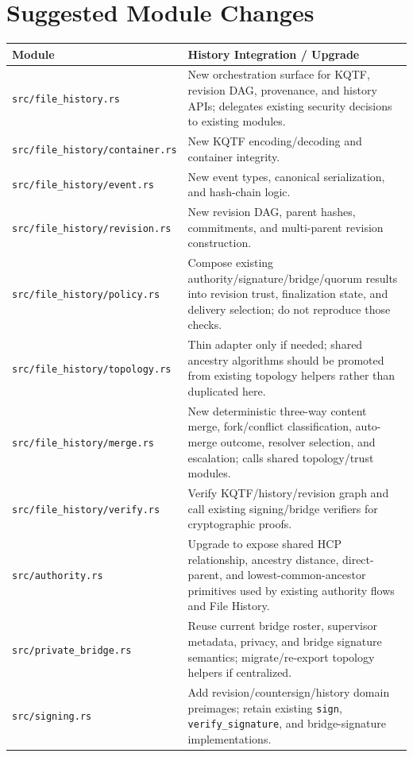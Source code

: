 \documentclass[11pt]{article}
\begin{document}
\section{Suggested Module Changes}

{\small
\setlength{\tabcolsep}{5pt}
\renewcommand{\arraystretch}{1.12}
\begin{tabularx}{\textwidth}{
  >{\raggedright\arraybackslash}p{}
  >{\raggedright\arraybackslash}X
}
\toprule
\textbf{Module} & \textbf{History Integration / Upgrade} \\
\midrule
\texttt{src/file\_history.rs} & New orchestration surface for KQTF, revision DAG, provenance, and history APIs; delegates existing security decisions to existing modules. \\
\texttt{src/file\_history/container.rs} & New KQTF encoding/decoding and container integrity. \\
\texttt{src/file\_history/event.rs} & New event types, canonical serialization, and hash-chain logic. \\
\texttt{src/file\_history/revision.rs} & New revision DAG, parent hashes, commitments, and multi-parent revision construction. \\
\texttt{src/file\_history/policy.rs} & Compose existing authority/signature/bridge/quorum results into revision trust, finalization state, and delivery selection; do not reproduce those checks. \\
\texttt{src/file\_history/topology.rs} & Thin adapter only if needed; shared ancestry algorithms should be promoted from existing topology helpers rather than duplicated here. \\
\texttt{src/file\_history/merge.rs} & New deterministic three-way content merge, fork/conflict classification, auto-merge outcome, resolver selection, and escalation; calls shared topology/trust modules. \\
\texttt{src/file\_history/verify.rs} & Verify KQTF/history/revision graph and call existing signing/bridge verifiers for cryptographic proofs. \\
\texttt{src/authority.rs} & Upgrade to expose shared HCP relationship, ancestry distance, direct-parent, and lowest-common-ancestor primitives used by existing authority flows and File History. \\
\texttt{src/private\_bridge.rs} & Reuse current bridge roster, supervisor metadata, privacy, and bridge signature semantics; migrate/re-export topology helpers if centralized. \\
\texttt{src/signing.rs} & Add revision/countersign/history domain preimages; retain existing \texttt{sign}, \texttt{verify\_signature}, and bridge-signature implementations. \\

\end{tabularx}}
\end{document}
